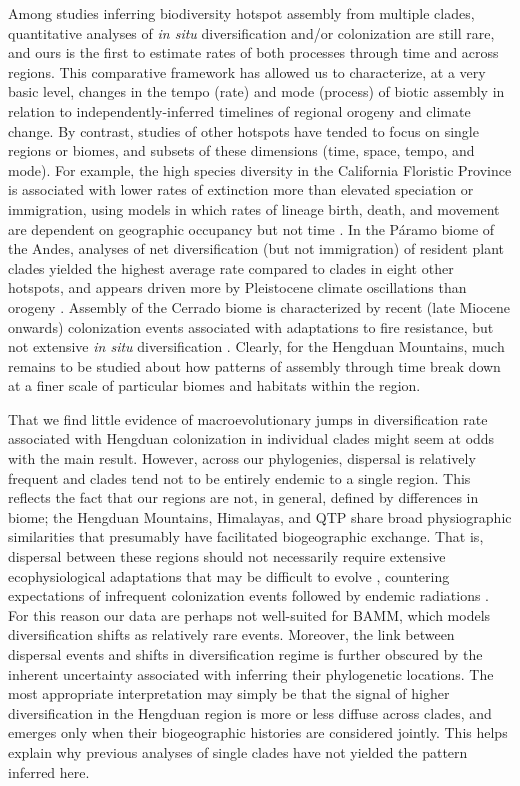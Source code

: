 Among studies inferring biodiversity hotspot assembly from multiple
clades, quantitative analyses of \textit{in situ} diversification
and/or colonization are still rare, and ours is the first to estimate
rates of both processes through time and across regions. This
comparative framework has allowed us to characterize, at a very basic
level, changes in the tempo (rate) and mode (process) of biotic
assembly in relation to independently-inferred timelines of regional
orogeny and climate change. By contrast, studies of other hotspots
have tended to focus on single regions or biomes, and subsets of these
dimensions (time, space, tempo, and mode). For example, the high
species diversity in the California Floristic Province is associated
with lower rates of extinction more than elevated speciation or
immigration, using models in which rates of lineage birth, death, and
movement are dependent on geographic occupancy but not time
\citep{lancaster2013}. In the Páramo biome of the Andes, analyses of
net diversification (but not immigration) of resident plant clades
yielded the highest average rate compared to clades in eight other
hotspots, and appears driven more by Pleistocene climate oscillations
than orogeny \citep{Madrinan2013}. Assembly of the Cerrado biome is
characterized by recent (late Miocene onwards) colonization events
associated with adaptations to fire resistance, but not extensive
\textit{in situ} diversification \citep{simon2009}. Clearly, for the
Hengduan Mountains, much remains to be studied about how patterns of
assembly through time break down at a finer scale of particular biomes
and habitats within the region.

That we find little evidence of macroevolutionary jumps in
diversification rate associated with Hengduan colonization in
individual clades might seem at odds with the main result. However,
across our phylogenies, dispersal is relatively frequent and clades
tend not to be entirely endemic to a single region. This reflects the
fact that our regions are not, in general, defined by differences in
biome; the Hengduan Mountains, Himalayas, and QTP share broad
physiographic similarities that presumably have facilitated
biogeographic exchange. That is, dispersal between these regions
should not necessarily require extensive ecophysiological adaptations
that may be difficult to evolve \citep{Donoghue2014}, countering
expectations of infrequent colonization events followed by endemic
radiations \citep[cf.][]{Hughes2006}. For this reason our data are
perhaps not well-suited for BAMM, which models diversification shifts
as relatively rare events. Moreover, the link between dispersal events
and shifts in diversification regime is further obscured by the
inherent uncertainty associated with inferring their phylogenetic
locations. The most appropriate interpretation may simply be that the
signal of higher diversification in the Hengduan region is more or
less diffuse across clades, and emerges only when their biogeographic
histories are considered jointly. This helps explain why previous
analyses of single clades have not yielded the pattern inferred here.

